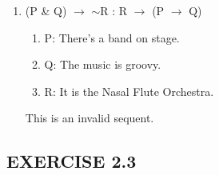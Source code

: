 \documentclass[a4paper,12pt]{article}
\newcommand{\ra}{$\rightarrow$ }
\newcommand{\s}{$\sim$}
\begin{document}
\begin{enumerate}[label=\arabic*,leftmargin=*]
        \item (P \& Q) \ra \s R : R \ra (P \ra Q)
            \nopagebreak
            \begin{enumerate}[label=(\roman*)]
                \item P: There's a band on stage.
                \item Q: The music is groovy.
                \item R: It is the Nasal Flute Orchestra.
            \end{enumerate}
            This is an invalid sequent.

    \end{enumerate}

    \subsection*{EXERCISE 2.3}
\end{document}
